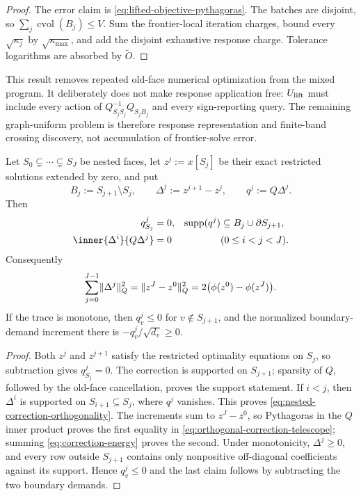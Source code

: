 \begin{proof}
The error claim is \cref{eq:lifted-objective-pythagoras}.  The batches are
disjoint, so
$\sum_j\operatorname{cvol}(B_j)\leq V$.  Sum the frontier-local iteration
charges, bound every $\sqrt{\kappa_j}$ by
$\sqrt{\kappa_{\max}}$, and add the disjoint exhaustive response charge.
Tolerance logarithms are absorbed by $\widetilde O$.
\end{proof}

This result removes repeated old-face numerical optimization from the mixed
program.  It deliberately does not make response application free:
$U_{\rm lift}$ must include every action of
$Q_{S_jS_j}^{-1}Q_{S_jB_j}$ and every sign-reporting query.  The remaining
graph-uniform problem is therefore response representation and finite-band
crossing discovery, not accumulation of frontier-solve error.

\begin{proposition}
\label{prop:dual-local-orthogonal-corrections}
Let $S_0\subsetneq\cdots\subsetneq S_J$ be nested faces, let
$z^j:=x[S_j]$ be their exact restricted solutions extended by zero, and put
\begin{equation}
 B_j:=S_{j+1}\setminus S_j,
 \qquad
 \Delta^j:=z^{j+1}-z^j,
 \qquad
 q^j:=Q\Delta^j.
 \label{eq:dual-local-corrections}
\end{equation}
Then
\begin{align}
 q^j_{S_j}&=0,
 &\supp(q^j)&\subseteq B_j\cup\partial S_{j+1},
 \label{eq:dual-frontier-support}\\
 \inner{\Delta^i}{Q\Delta^j}&=0
 &&(0\leq i<j<J).
 \label{eq:nested-correction-orthogonality}
\end{align}
Consequently
\begin{equation}
 \sum_{j=0}^{J-1}\lVert\Delta^j\rVert_Q^2
 =\lVert z^J-z^0\rVert_Q^2
 =2\bigl(\phi(z^0)-\phi(z^J)\bigr).
 \label{eq:orthogonal-correction-telescope}
\end{equation}
If the trace is monotone, then $q^j_v\leq0$ for
$v\notin S_{j+1}$, and the normalized boundary-demand increment there is
$-q^j_v/\sqrt{d_v}\geq0$.
\end{proposition}

\begin{proof}
Both $z^j$ and $z^{j+1}$ satisfy the restricted optimality equations on
$S_j$, so subtraction gives $q^j_{S_j}=0$.  The correction is supported on
$S_{j+1}$; sparsity of $Q$, followed by the old-face cancellation, proves
the support statement.  If $i<j$, then $\Delta^i$ is supported on
$S_{i+1}\subseteq S_j$, where $q^j$ vanishes.  This proves
\cref{eq:nested-correction-orthogonality}.  The increments sum to
$z^J-z^0$, so Pythagoras in the $Q$ inner product proves the first equality
in \cref{eq:orthogonal-correction-telescope}; summing
\cref{eq:correction-energy} proves the second.  Under monotonicity,
$\Delta^j\geq0$, and every row outside $S_{j+1}$ contains only nonpositive
off-diagonal coefficients against its support.  Hence $q_v^j\leq0$ and the
last claim follows by subtracting the two boundary demands.
\end{proof}

